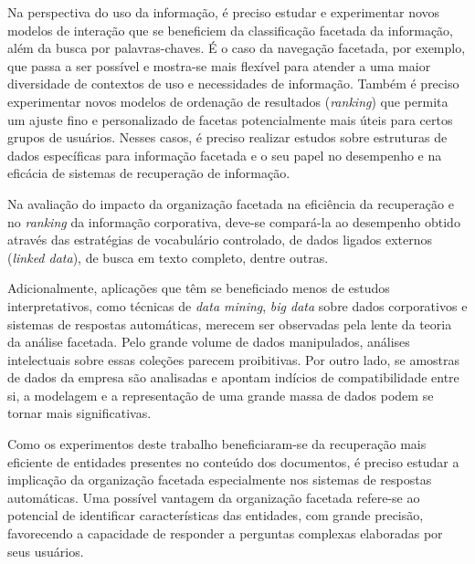 
Na perspectiva do uso da informação, é preciso estudar e experimentar novos modelos de interação que se beneficiem da classificação facetada da informação, além da busca por palavras-chaves. É o caso da navegação facetada, por exemplo, que passa a ser possível e mostra-se mais flexível para atender a uma maior diversidade de contextos de uso e necessidades de informação. Também é preciso experimentar novos modelos de ordenação de resultados (\textit{ranking}) que permita um ajuste fino e personalizado de facetas potencialmente mais úteis para certos grupos de usuários. Nesses casos, é preciso realizar estudos sobre estruturas de dados específicas para informação facetada e o seu papel no desempenho e na eficácia de sistemas de recuperação de informação.

Na avaliação do impacto da organização facetada na eficiência da recuperação e no \textit{ranking} da informação corporativa, deve-se compará-la ao desempenho obtido através das estratégias de vocabulário controlado, de dados ligados externos (\textit{linked data}), de busca em texto completo, dentre outras.

Adicionalmente, aplicações que têm se beneficiado menos de estudos interpretativos, como técnicas de \textit{data mining}, \textit{big data} sobre dados corporativos e sistemas de respostas automáticas, merecem ser observadas pela lente da teoria da análise facetada. Pelo grande volume de dados manipulados, análises intelectuais sobre essas coleções parecem proibitivas. Por outro lado, se amostras de dados da empresa são analisadas e apontam indícios de compatibilidade entre si, a modelagem e a representação de uma grande massa de dados podem se tornar mais significativas.

Como os experimentos deste trabalho beneficiaram-se da recuperação mais eficiente de entidades presentes no conteúdo dos documentos, é preciso estudar a implicação da organização facetada especialmente nos sistemas de respostas automáticas. Uma possível vantagem da organização facetada refere-se ao potencial de identificar características das entidades, com grande precisão, favorecendo a capacidade de responder a perguntas complexas elaboradas por seus usuários.

